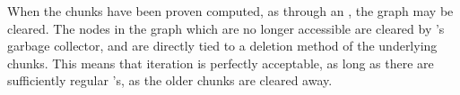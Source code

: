 
When the chunks have been proven computed, as through an , the graph may be cleared.
The nodes in the graph which are no longer accessible are cleared by \R's garbage collector, and are directly tied to a deletion method of the underlying chunks.
This means that iteration is perfectly acceptable, as long as there are sufficiently regular 's, as the older chunks are cleared away.
